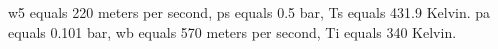w5 equals 220 meters per second, ps equals 0.5 bar, Ts equals 431.9 Kelvin. pa equals 0.101 bar, wb equals 570 meters per second, Ti equals 340 Kelvin.